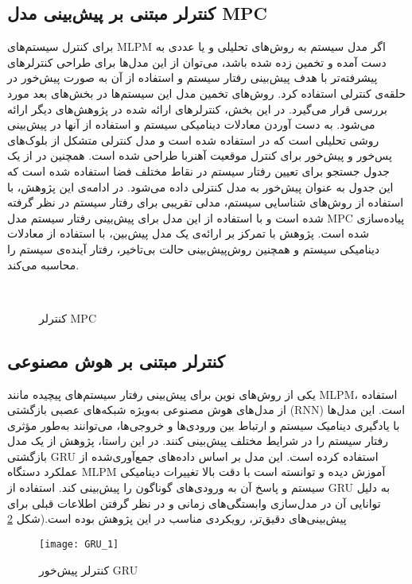 \subsection{کنترلر مبتنی بر پیش‌بینی مدل MPC}
برای کنترل سیستم‌های MLPM اگر مدل سیستم به روش‌های تحلیلی و یا عددی به دست آمده و تخمین زده شده باشد، می‌توان از این مدل‌ها برای طراحی کنترلرهای پیشرفته‌تر با هدف پیش‌بینی رفتار سیستم و استفاده از آن به صورت پیش‌خور در حلقه‌ی کنترلی استفاده کرد. روش‌های تخمین مدل این سیستم‌ها در بخش‌های بعد مورد بررسی قرار می‌گیرد. در این بخش، کنترلرهای ارائه شده در پژوهش‌های دیگر ارائه می‌شود.
به دست آوردن معادلات دینامیکی سیستم و استفاده از آنها در پیش‌بینی روشی تحلیلی است که در 
\cite{RN55}
استفاده شده است و مدل کنترلی متشکل از بلوک‌های پس‌خور و پیش‌خور برای کنترل موقعیت آهنربا طراحی شده است. همچنین در 
\cite{RN62}
از یک جدول جستجو برای تعیین رفتار سیستم در نقاط مختلف فضا استفاده شده است که این جدول به عنوان پیش‌خور به مدل کنترلی داده می‌شود. در ادامه‌ی این پژوهش، با استفاده از روش‌های شناسایی سیستم، مدلی تقریبی برای رفتار سیستم در نظر گرفته شده است و با استفاده از این مدل برای پیش‌بینی رفتار سیستم‌ مدل MPC پیاده‌سازی شده است. پژوهش 
\cite{RN30}
با تمرکز بر ارائه‌ی یک مدل پیش‌بین، با استفاده از معادلات دینامیکی سیستم و همچنین روش‌پیش‌بینی حالت بی‌تاخیر، رفتار آینده‌ی سیستم را محاسبه می‌کند.
\begin{figure}[ht]
	\centering 
	\\ %
	\caption{کنترلر MPC}
	\label{fig:MPC} %
\end{figure}

\FloatBarrier

\subsection{کنترلر مبتنی بر هوش مصنوعی}

یکی از روش‌های نوین برای پیش‌بینی رفتار سیستم‌های پیچیده مانند MLPM، استفاده از مدل‌های هوش مصنوعی به‌ویژه شبکه‌های عصبی بازگشتی (RNN) است. این مدل‌ها با یادگیری دینامیک سیستم و ارتباط بین ورودی‌ها و خروجی‌ها، می‌توانند به‌طور مؤثری رفتار سیستم را در شرایط مختلف پیش‌بینی کنند. در این راستا، پژوهش
\cite{RN61}
از یک مدل بازگشتی GRU 
استفاده کرده است. این مدل بر اساس داده‌های جمع‌آوری‌شده از عملکرد دستگاه MLPM آموزش دیده و توانسته است با دقت بالا تغییرات دینامیکی سیستم و پاسخ آن به ورودی‌های گوناگون را پیش‌بینی کند. استفاده از GRU به دلیل توانایی آن در مدل‌سازی وابستگی‌های زمانی و در نظر گرفتن اطلاعات قبلی برای پیش‌بینی‌های دقیق‌تر، رویکردی مناسب در این پژوهش بوده است.(شکل 
\ref{fig:GRU}

\begin{figure}[H]
	\centering
	\texttt{[image: GRU\_1]}
	\caption{کنترلر پیش‌خور GRU \cite{RN61}}
	\label{fig:GRU}
\end{figure}

